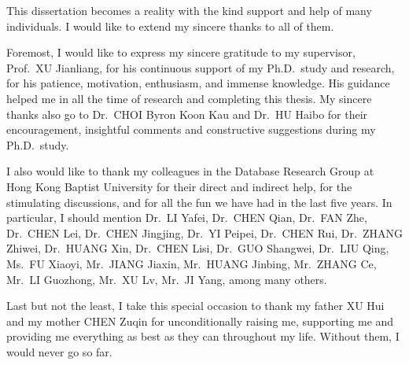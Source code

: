 \begin{acknowledgements}
This dissertation becomes a reality with the kind support and help of many individuals. I would like to extend my sincere thanks to all of them.

Foremost, I would like to express my sincere gratitude to my supervisor, Prof.~XU Jianliang, for his continuous support of my Ph.D.\ study and research, for his patience, motivation, enthusiasm, and immense knowledge. His guidance helped me in all the time of research and completing this thesis. My sincere thanks also go to Dr.~CHOI Byron Koon Kau and Dr.~HU Haibo for their encouragement, insightful comments and constructive suggestions during my Ph.D.\ study.

I also would like to thank my colleagues in the Database Research Group at Hong Kong Baptist University for their direct and indirect help, for the stimulating discussions, and for all the fun we have had in the last five years. In particular, I should mention Dr.~LI Yafei, Dr.~CHEN Qian, Dr.~FAN Zhe, Dr.~CHEN Lei, Dr.~CHEN Jingjing, Dr.~YI Peipei, Dr.~CHEN Rui, Dr.~ZHANG Zhiwei, Dr.~HUANG Xin, Dr.~CHEN Lisi, Dr.~GUO Shangwei, Dr.~LIU Qing, Ms.~FU Xiaoyi, Mr.~JIANG Jiaxin, Mr.~HUANG Jinbing, Mr.~ZHANG Ce, Mr.~LI Guozhong, Mr.~XU Lv, Mr.~JI Yang, among many others.

Last but not the least, I take this special occasion to thank my father XU Hui and my mother CHEN Zuqin for unconditionally raising me, supporting me and providing me everything as best as they can throughout my life. Without them, I would never go so far.
\end{acknowledgements}
